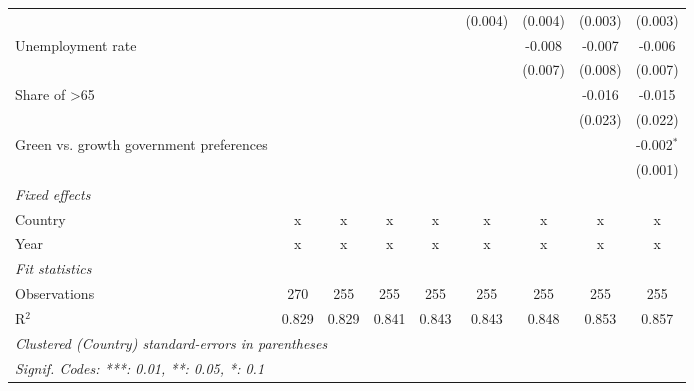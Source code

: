 \begin{table}[htbp]
\begin{tabular}{lcccccccc}
                                                       &         &         &             &              & (0.004)      & (0.004)      & (0.003)       & (0.003)\\   
      Unemployment rate                                &         &         &             &              &              & -0.008       & -0.007        & -0.006\\   
                                                       &         &         &             &              &              & (0.007)      & (0.008)       & (0.007)\\   
      Share of >65                                     &         &         &             &              &              &              & -0.016        & -0.015\\   
                                                       &         &         &             &              &              &              & (0.023)       & (0.022)\\   
      Green vs. growth government preferences          &         &         &             &              &              &              &               & -0.002$^{*}$\\   
                                                       &         &         &             &              &              &              &               & (0.001)\\   
      \emph{Fixed effects}\\
      Country                                          & x       & x       & x           & x            & x            & x            & x             & x\\  
      Year                                             & x       & x       & x           & x            & x            & x            & x             & x\\  
      \midrule \emph{Fit statistics}\\
      Observations                                     & 270     & 255     & 255         & 255          & 255          & 255          & 255           & 255\\  
      R$^2$                                            & 0.829   & 0.829   & 0.841       & 0.843        & 0.843        & 0.848        & 0.853         & 0.857\\  
      \midrule
      \multicolumn{9}{l}{\emph{Clustered (Country) standard-errors in parentheses}}\\
      \multicolumn{9}{l}{\emph{Signif. Codes: ***: 0.01, **: 0.05, *: 0.1}}\\
   \end{tabular}
\end{table}



